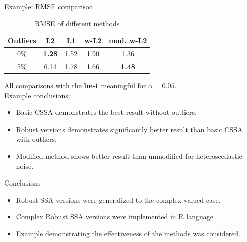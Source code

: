 \documentclass[ucs, notheorems, handout]{beamer}
\begin{document}
\begin{frame}{Example: RMSE comparison}
    \begin{table}[H]
	\begin{center}
		\caption{RMSE of different methods}
		\label{tab3}
		\begin{tabular}{|c|c|c|c|c|}
			\hline
			Outliers & L2 & L1 & w-L2 & mod. w-L2 \\ 
			\hline
			0\% & \textbf{1.28}  & 1.52  & 1.90 & 1.36 \\
			\hline
			5\% & 6.14  & 1.78  & 1.66 & \textbf{1.48} \\
			\hline
		\end{tabular}
	\end{center}
    \end{table}

All comparisons with the \textbf{best} meaningful for $\alpha = 0.05$.\\
\vspace{1em}
Example conclusions:
\begin{itemize}
    \item Basic CSSA demonstrates the best result without outliers,
    \item Robust versions demonstrates significantly better result than basic CSSA with outliers,
    \item Modified method shows better result than unmodified for heteroscedastic noise.
\end{itemize}
\end{frame}

\begin{frame}{Conclusions}
    \begin{itemize}
        \item Robust SSA versions were generalized to the complex-valued case.
        \item Complex Robust SSA versions were implemented in R language.
        \item Example demonstrating the effectiveness of the methods was considered. 
    \end{itemize}
\end{frame}
\end{document}

